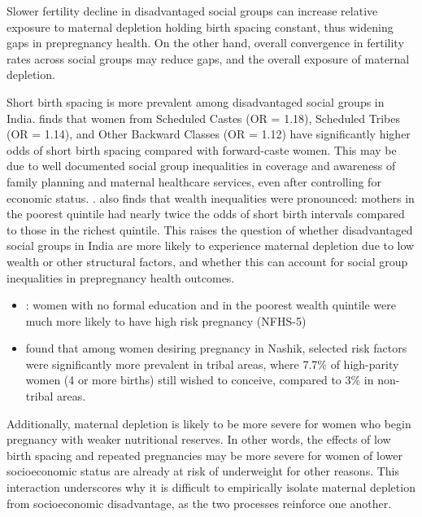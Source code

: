 Slower fertility decline in disadvantaged social groups can increase relative exposure to maternal depletion holding birth spacing constant, thus widening gaps in prepregnancy health. On the other hand, overall convergence in fertility rates across social groups may reduce gaps, and the overall exposure of maternal depletion. 


Short birth spacing is more prevalent among disadvantaged social groups in India. \cite{singh2024wealth} finds that women from Scheduled Castes (OR = 1.18), Scheduled Tribes (OR = 1.14), and Other Backward Classes (OR = 1.12) have significantly higher odds of short birth spacing compared with forward-caste women. This may be due to well documented social group inequalities in coverage and awareness of family planning and maternal healthcare services, even after controlling for economic status. \citep{kumar2016explaining}. \cite{singh2024wealth} also finds that wealth inequalities were pronounced: mothers in the poorest quintile had nearly twice the odds of short birth intervals compared to those in the richest quintile. This raises the question of whether disadvantaged social groups in India are more likely to experience maternal depletion due to low wealth or other structural factors, and whether this can account for social group inequalities in prepregnancy health outcomes.

\begin{itemize}
    \item \cite{kuppusamy2023high}: women with no formal education and in the poorest wealth quintile were much more likely to have high risk pregnancy (NFHS-5)

    \item \cite{doke2022prevalence} found that among women desiring pregnancy in Nashik, selected risk factors were significantly more prevalent in tribal areas, where 7.7\% of high-parity women (4 or more births) still wished to conceive, compared to 3\% in non-tribal areas.
    
\end{itemize}
Additionally, maternal depletion is likely to be more severe for women who begin pregnancy with weaker nutritional reserves. In other words, the effects of low birth spacing and repeated pregnancies may be more severe for women of lower socioeconomic status are already at risk of underweight for other reasons. This interaction underscores why it is difficult to empirically isolate maternal depletion from socioeconomic disadvantage, as the two processes reinforce one another.

